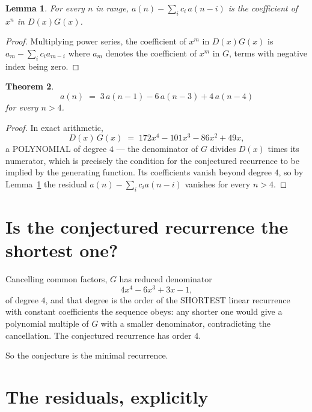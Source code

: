 \documentclass[11pt,a4paper]{article}
\theoremstyle{plain}
\newtheorem{theorem}{Theorem}
\newtheorem{lemma}[theorem]{Lemma}
\theoremstyle{definition}
\begin{document}
\begin{lemma}\label{lem:key}
For every $n$ in range, $a(n)-\sum_i c_i\,a(n-i)$ is the coefficient of $x^{n}$ in
$D(x)G(x)$.
\end{lemma}

\begin{proof}
Multiplying power series, the coefficient of $x^{m}$ in $D(x)G(x)$ is
$a_m-\sum_i c_i a_{m-i}$ where $a_m$ denotes the coefficient of $x^{m}$ in $G$, terms with
negative index being zero.
\end{proof}

\begin{theorem}
\[
a(n)\;=\;3\,a(n-1) - 6\,a(n-3) + 4\,a(n-4)
\]
for every $n>4$.
\end{theorem}

\begin{proof}
In exact arithmetic,
\[
D(x)\,G(x)\;=\;172 x^{4} - 101 x^{3} - 86 x^{2} + 49 x,
\]
a POLYNOMIAL of degree $4$ --- the denominator of $G$ divides $D(x)$ times its numerator,
which is precisely the condition for the conjectured recurrence to be implied by the
generating function. Its coefficients vanish beyond degree $4$, so by
Lemma~\ref{lem:key} the residual $a(n)-\sum_ic_ia(n-i)$ vanishes for every
$n>4$.
\end{proof}

\section{Is the conjectured recurrence the shortest one?}

Cancelling common factors, $G$ has reduced denominator
\[
4 x^{4} - 6 x^{3} + 3 x - 1,
\]
of degree $4$, and that degree is the order of the SHORTEST linear recurrence with
constant coefficients the sequence obeys: any shorter one would give a polynomial multiple of
$G$ with a smaller denominator, contradicting the cancellation. The conjectured recurrence has
order $4$.

So the conjecture is the minimal recurrence.

\section{The residuals, explicitly}
\end{document}
